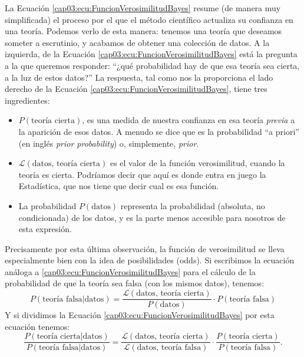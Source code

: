La Ecuación \ref{cap03:ecu:FuncionVerosimilitudBayes} resume (de manera muy simplificada) el proceso por el que el método científico actualiza su confianza en una teoría. Podemos verlo de esta manera: tenemos una teoría que deseamos someter a escrutinio, y acabamos de obtener una colección de datos. A la izquierda, de la Ecuación \ref{cap03:ecu:FuncionVerosimilitudBayes} está la pregunta a la que queremos responder: ``¿qué probabilidad hay de que esa teoría sea cierta, a la luz de estos datos?'' La respuesta, tal como nos la proporciona el lado derecho de la Ecuación \ref{cap03:ecu:FuncionVerosimilitudBayes}, tiene tres ingredientes:
\begin{itemize}
  \item $P(\mbox{teoría cierta})$, es una medida de nuestra confianza en esa teoría {\em previa} a la aparición de esos datos. A menudo se dice que es la probabilidad {``a priori''} (en inglés {\em prior probability}) o, simplemente, {\em prior}.
  \item $\mathcal{L}(\mbox{datos, teoría cierta})$ es el valor de la función verosimilitud, cuando la teoría es cierta. Podríamos decir que aquí es donde entra en juego la Estadística, que nos tiene que decir cual es esa función.
  \item La probabilidad $P(\mbox{datos})$ representa la probabilidad (absoluta, no condicionada) de los datos, y es la parte menos accesible para nosotros de esta expresión.
\end{itemize}
Precisamente por esta última observación, la función de verosimilitud se lleva especialmente bien con la idea de posibilidades (odds).  Si escribimos la ecuación análoga a \ref{cap03:ecu:FuncionVerosimilitudBayes} para el cálculo de la probabilidad de que la teoría sea falsa (con los mismos datos), tenemos:
\[
P(\mbox{teoría falsa}|\mbox{datos})=
\dfrac{\mathcal{L}(\mbox{datos, teoría cierta})}{P(\mbox{datos})}
\cdot P(\mbox{teoría falsa})
\]
Y si dividimos la Ecuación \ref{cap03:ecu:FuncionVerosimilitudBayes} por esta ecuación tenemos:
\begin{equation}
\label{cap03:ecu:CocienteVerosimilitudes}
\dfrac{P(\mbox{teoría cierta}|\mbox{datos})}{P(\mbox{teoría falsa}|\mbox{datos})}=
\dfrac{\mathcal{L}(\mbox{datos, teoría cierta})}{\mathcal{L}(\mbox{datos, teoría falsa})}
\cdot
\dfrac{P(\mbox{teoría cierta})}{P(\mbox{teoría falsa})}.
\end{equation}
